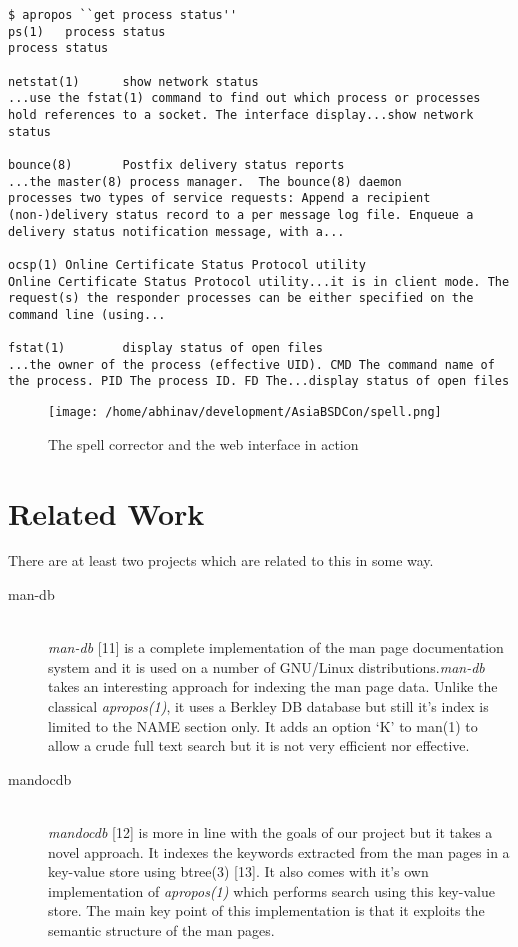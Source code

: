 \documentclass[titlepage, a4paper, 12pt]{article}
\begin{document}
\begin{lstlisting}
$ apropos ``get process status''
ps(1)   process status
process status

netstat(1)      show network status
...use the fstat(1) command to find out which process or processes
hold references to a socket. The interface display...show network
status

bounce(8)       Postfix delivery status reports
...the master(8) process manager.  The bounce(8) daemon
processes two types of service requests: Append a recipient
(non-)delivery status record to a per message log file. Enqueue a
delivery status notification message, with a...

ocsp(1) Online Certificate Status Protocol utility
Online Certificate Status Protocol utility...it is in client mode. The
request(s) the responder processes can be either specified on the
command line (using...

fstat(1)        display status of open files
...the owner of the process (effective UID). CMD The command name of
the process. PID The process ID. FD The...display status of open files
\end{lstlisting}

\begin{figure}[htp]
\texttt{[image: /home/abhinav/development/AsiaBSDCon/spell.png]}
\caption{The spell corrector and the web interface in action}
\label{}
\end{figure}
\section{Related Work}
There are at least two projects which are related to this in some way.
\begin{description}
\item[man-db] \hfill \\
\textit{man-db} [11] is a complete implementation of the man page documentation
system and it is used on a number of GNU/Linux distributions.\textit{man-db}
takes an interesting approach for indexing the man page data. Unlike the
classical \textit{apropos(1)}, it uses a Berkley DB database but still it's index
is limited to the NAME section only. It adds an option `K' to man(1) to allow a
crude full text search but it is not very efficient nor effective.
\end{description}
\begin{description}
\item[mandocdb] \hfill \\
\textit{mandocdb} [12] is more in line with the goals of our project but it takes
a novel approach. It indexes the keywords extracted from the man pages in a
key-value store using btree(3) [13]. It also comes with it's own implementation
of \textit{apropos(1)} which performs search using this key-value store. The
main key point of this implementation is that it exploits the semantic structure
of the man pages. 
\end{description}
\end{document}

